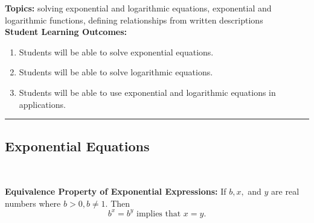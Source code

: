 


\noindent \textbf{Topics:}  solving exponential and logarithmic equations, exponential and logarithmic functions, defining relationships from written descriptions\\

\noindent \textbf{Student Learning Outcomes:}
\begin{enumerate}
\item Students will be able to solve exponential equations.
\item Students will be able to solve logarithmic equations.
\item Students will be able to use exponential and logarithmic equations in applications.
\end{enumerate}

\hrule 

\bigskip

\subsection{Exponential Equations} ~


\noindent \textbf{Equivalence Property of Exponential Expressions:} If $b, x,$ and $y$ are real numbers where $b>0, b \neq 1.$  Then $$b^x=b^y \text{ implies that } x=y.$$   



